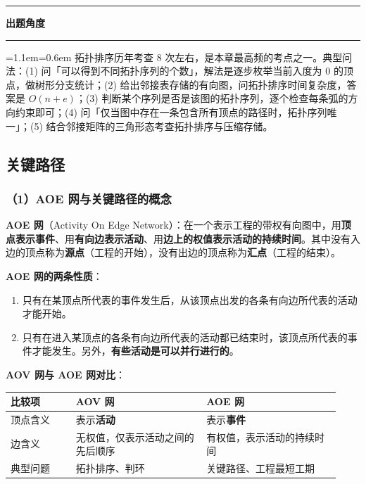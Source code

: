\documentclass[11pt,openany,UTF8]{ctexbook}
\newcommand{\callouthead}[2]{%
  \par\addvspace{7pt}\noindent
  {\color{#1}\rule[-0.15em]{3pt}{1.05em}}\hspace{0.5em}%
  {\bfseries\color{#1}#2}\par\nobreak\vspace{-0.35em}%
  {\color{rulesep}\hrule height 0.4pt}\nobreak\vspace{0.45em}%
  \begingroup\small\setlength{\parindent}{0pt}%
  \leftskip=1.1em\rightskip=0.6em\noindent\ignorespaces}
\newcommand{\calloutend}{\par\endgroup\addvspace{7pt}}
\newenvironment{callexam}[1]{\callouthead{exambar}{#1}}{\calloutend}
\begin{document}
\begin{callexam}{出题角度}
拓扑排序历年考查 8 次左右，是本章最高频的考点之一。典型问法：(1) 问「可以得到不同拓扑序列的个数」，解法是逐步枚举当前入度为 0 的顶点，做树形分支统计；(2) 给出邻接表存储的有向图，问拓扑排序时间复杂度，答案是 $O(n+e)$；(3) 判断某个序列是否是该图的拓扑序列，逐个检查每条弧的方向约束即可；(4) 问「仅当图中存在一条包含所有顶点的路径时，拓扑序列唯一」；(5) 结合邻接矩阵的三角形态考查拓扑排序与压缩存储。

\end{callexam}

\subsection{关键路径}

\subsubsection{（1）AOE 网与关键路径的概念}

\textbf{AOE 网}（Activity On Edge Network）：在一个表示工程的带权有向图中，用\textbf{顶点表示事件}、用\textbf{有向边表示活动}、用\textbf{边上的权值表示活动的持续时间}。其中没有入边的顶点称为\textbf{源点}（工程的开始），没有出边的顶点称为\textbf{汇点}（工程的结束）。

\textbf{AOE 网的两条性质}：

\begin{enumerate}
\item 只有在某顶点所代表的事件发生后，从该顶点出发的各条有向边所代表的活动才能开始。
\item 只有在进入某顶点的各条有向边所代表的活动都已结束时，该顶点所代表的事件才能发生。另外，\textbf{有些活动是可以并行进行的}。
\end{enumerate}
\textbf{AOV 网与 AOE 网对比}：

\begingroup\small\setlength{\tabcolsep}{4.0pt}
\begin{longtable}{@{}L{0.1834\linewidth}L{0.3668\linewidth}L{0.3783\linewidth}@{}}
\toprule
\textbf{比较项} & \textbf{AOV 网} & \textbf{AOE 网} \\
\midrule
\endhead
顶点含义 & 表示\textbf{活动} & 表示\textbf{事件} \\
边含义 & 无权值，仅表示活动之间的先后顺序 & 有权值，表示活动的持续时间 \\
典型问题 & 拓扑排序、判环 & 关键路径、工程最短工期 \\
\bottomrule
\end{longtable}
\endgroup
\end{document}
